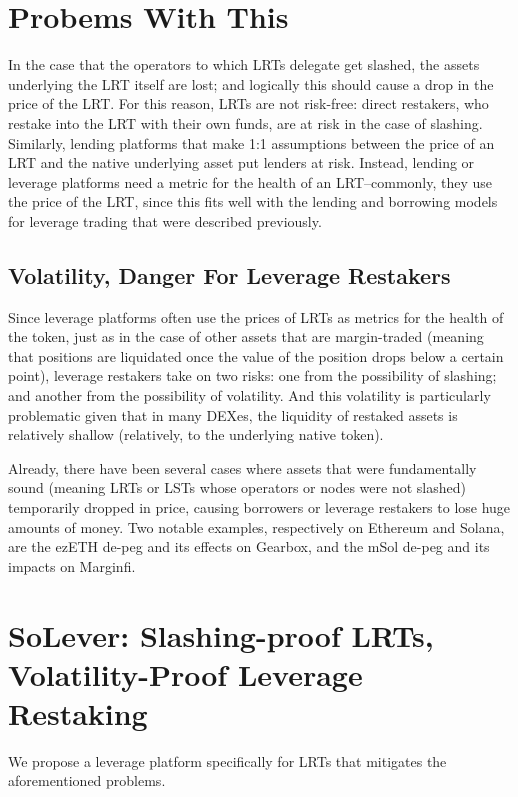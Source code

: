 \documentclass{article}
\begin{document}
\section{Probems With This}
In the case that the operators to which LRTs delegate get slashed, the assets underlying the LRT itself are lost; and logically this should cause a drop in the price of the LRT. For this reason, LRTs are not risk-free: direct restakers, who restake into the LRT with their own funds, are at risk in the case of slashing. Similarly, lending platforms that make 1:1 assumptions between the price of an LRT and the native underlying asset put lenders at risk.
Instead, lending or leverage platforms need a metric for the health of an LRT--commonly, they use the price of the LRT, since this fits well with the lending and borrowing models for leverage trading that were described previously.

\subsection{Volatility, Danger For Leverage Restakers}
Since leverage platforms often use the prices of LRTs as metrics for the health of the token, just as in the case of other assets that are margin-traded (meaning that positions are liquidated once the value of the position drops below a certain point), leverage restakers take on two risks: one from the possibility of slashing; and another from the possibility of volatility. And this volatility is particularly problematic given that in many DEXes, the liquidity of restaked assets is relatively shallow (relatively, to the underlying native token).

Already, there have been several cases where assets that were fundamentally sound (meaning LRTs or LSTs whose operators or nodes were not slashed) temporarily dropped in price, causing borrowers or leverage restakers to lose huge amounts of money. Two notable examples, respectively on Ethereum and Solana, are the ezETH de-peg and its effects on Gearbox, and the mSol de-peg and its impacts on Marginfi.



\section{SoLever: Slashing-proof LRTs, Volatility-Proof Leverage Restaking}
We propose a leverage platform specifically for LRTs that mitigates the aforementioned problems.
\end{document}
